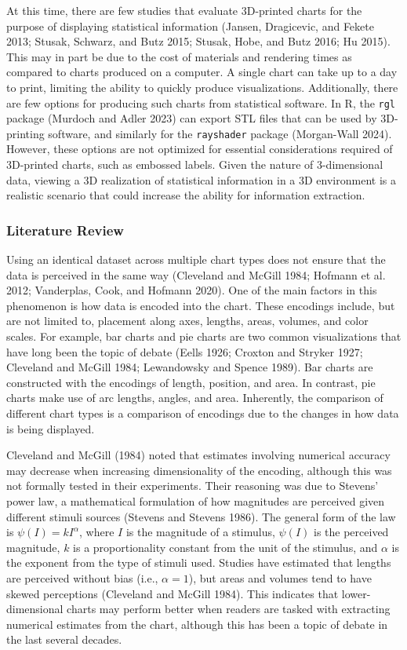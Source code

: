 \documentclass[
  letterpaper,
  DIV=11,
  numbers=noendperiod]{scrartcl}
\begin{document}
At this time, there are few studies that evaluate 3D-printed charts for
the purpose of displaying statistical information (Jansen, Dragicevic,
and Fekete 2013; Stusak, Schwarz, and Butz 2015; Stusak, Hobe, and Butz
2016; Hu 2015). This may in part be due to the cost of materials and
rendering times as compared to charts produced on a computer. A single
chart can take up to a day to print, limiting the ability to quickly
produce visualizations. Additionally, there are few options for
producing such charts from statistical software. In R, the \texttt{rgl}
package (Murdoch and Adler 2023) can export STL files that can be used
by 3D-printing software, and similarly for the \texttt{rayshader}
package (Morgan-Wall 2024). However, these options are not optimized for
essential considerations required of 3D-printed charts, such as embossed
labels. Given the nature of 3-dimensional data, viewing a 3D realization
of statistical information in a 3D environment is a realistic scenario
that could increase the ability for information extraction.

\subsubsection{Literature Review}\label{literature-review}

Using an identical dataset across multiple chart types does not ensure
that the data is perceived in the same way (Cleveland and McGill 1984;
Hofmann et al. 2012; Vanderplas, Cook, and Hofmann 2020). One of the
main factors in this phenomenon is how data is encoded into the chart.
These encodings include, but are not limited to, placement along axes,
lengths, areas, volumes, and color scales. For example, bar charts and
pie charts are two common visualizations that have long been the topic
of debate (Eells 1926; Croxton and Stryker 1927; Cleveland and McGill
1984; Lewandowsky and Spence 1989). Bar charts are constructed with the
encodings of length, position, and area. In contrast, pie charts make
use of arc lengths, angles, and area. Inherently, the comparison of
different chart types is a comparison of encodings due to the changes in
how data is being displayed.

Cleveland and McGill (1984) noted that estimates involving numerical
accuracy may decrease when increasing dimensionality of the encoding,
although this was not formally tested in their experiments. Their
reasoning was due to Stevens' power law, a mathematical formulation of
how magnitudes are perceived given different stimuli sources (Stevens
and Stevens 1986). The general form of the law is \(\psi(I)=kI^\alpha\),
where \(I\) is the magnitude of a stimulus, \(\psi(I)\) is the perceived
magnitude, \(k\) is a proportionality constant from the unit of the
stimulus, and \(\alpha\) is the exponent from the type of stimuli used.
Studies have estimated that lengths are perceived without bias (i.e.,
\(\alpha=1\)), but areas and volumes tend to have skewed perceptions
(Cleveland and McGill 1984). This indicates that lower-dimensional
charts may perform better when readers are tasked with extracting
numerical estimates from the chart, although this has been a topic of
debate in the last several decades.
\end{document}

